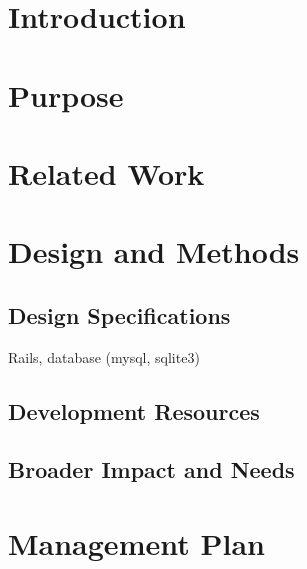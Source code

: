 \documentclass{article}
\begin{document}
%


%

%

\section{Introduction}

\section{Purpose}

\section{Related Work}

\section{Design and Methods}
\subsection{Design Specifications}
Rails, database (mysql, sqlite3)

\subsection{Development Resources}

\subsection{Broader Impact and Needs}

\section{Management Plan}
\end{document}
